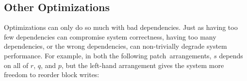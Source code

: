 \documentclass[9pt,twocolumn,letterpaper]{article}
\newcommand{\Kudos}{Featherstitch}
\newcommand{\patch}{patch}
\newcommand{\patches}{patches}
\newcommand{\module}{module}
\newcommand{\noop}{empty}
\newcommand{\Noop}{Empty}
\begin{document}
\begin{comment}
For a \module\ like the write-back cache to forward \patches\ in a
dependency-preserving order, the \module\ must find \patches\ whose \befores\
are all ``closer to the disk'' (or are also being forwarded as part of the same
block write). We say that such \patches\ are \emph{ready}. 


Each \patch\ has a count of the number of \befores\ it has at block device
modules just as close to the disk as it currently is, and a count of the number
of \befores\ it has which are in flight. When these counts are both zero, it is
ready. A \patch's \before\ counts are incrementally updated as \befores\ are
added and removed and as \beforing\ \patches\ are moved closer to the disk.

Because \Kudos\ makes sure that the \befores\ of a \patch\ are at least as
close to the disk as it is, only directly reachable \beforing\ \patches\ need to
be included in a \patch's \before\ counts. \Noop\ \patches, with the exception
of managed \noop\ \patches\ (which have an explicit owning block device), add a
wrinkle to this simplifying rule, however. They are considered to be as close to
the disk as their \before\ which is the farthest from the disk, in effect,
propagating the distance to the disk metric through them.

When a \before\ count update changes whether a \patch\ is ready to write, the
\patch's inclusion in its block's ready list is updated. To write a block, a
\module\ thus iterates through the block's ready list, sending \patches\ to the
target block device, until the list is empty. Thus instead of having to
repeatedly traverse \patch\ graphs to determine readiness on demand, we have
this information maintained automatically as it changes. This automatic
maintenance adds some cost to forwarding \patches\ and changing the graph
structure, but since it saves so much duplicate work\footnote{The amount of
duplicate work saved is actually superlinear in the size of the write-back
cache.} it is much more efficient.
\end{comment}


\subsection{Other Optimizations}
\label{sec:patch:misc}

Optimizations can only do so much
with bad dependencies.
%
Just as having too few dependencies can compromise system correctness,
having too many dependencies, or the wrong dependencies, can non-trivially
degrade system performance.
%
For example, in both the following \patch\ arrangements, $s$ depends on all
of $r$, $q$, and $p$, but the left-hand arrangement gives the system more
freedom to reorder block writes:
\end{document}
